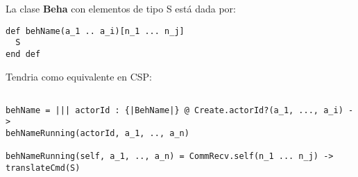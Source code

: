 La clase \textbf{Beha} con elementos de tipo S está dada por:

\begin{verbatim}
def behName(a_1 .. a_i)[n_1 ... n_j]
  S
end def
\end{verbatim}

Tendria como equivalente en CSP:

\begin{verbatim}

behName = ||| actorId : {|BehName|} @ Create.actorId?(a_1, ..., a_i) ->
behNameRunning(actorId, a_1, .., a_n)

behNameRunning(self, a_1, .., a_n) = CommRecv.self(n_1 ... n_j) -> translateCmd(S)

\end{verbatim}
